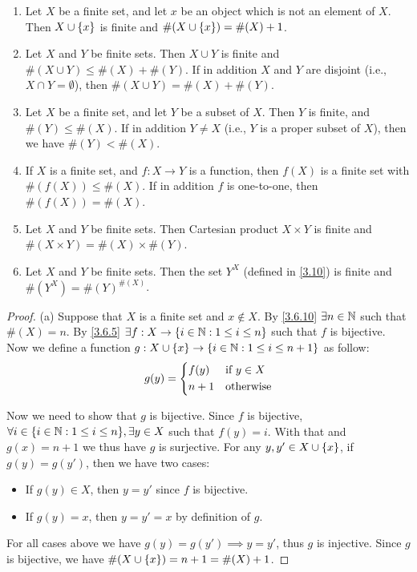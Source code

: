 \begin{prop}\label{3.6.14}
  \leavevmode
  \begin{enumerate}
    \item Let \(X\) be a finite set, and let \(x\) be an object which is not an element of \(X\).
          Then \(X \cup \left\lbrace x\right\rbrace\) is finite and \(\#(X \cup \left\lbrace x\right\rbrace) = \#(X) + 1\).
    \item Let \(X\) and \(Y\) be finite sets.
          Then \(X \cup Y\) is finite and \(\#(X \cup Y) \leq \#(X) + \#(Y)\).
          If in addition \(X\) and \(Y\) are disjoint (i.e., \(X \cap Y = \emptyset\)), then \(\#(X \cup Y) = \#(X) + \#(Y)\).
    \item Let \(X\) be a finite set, and let \(Y\) be a subset of \(X\).
          Then \(Y\) is finite, and \(\#(Y) \leq \#(X)\).
          If in addition \(Y \neq X\) (i.e., \(Y\) is a proper subset of \(X\)), then we have \(\#(Y) < \#(X)\).
    \item If \(X\) is a finite set, and \(f : X \to Y\) is a function, then \(f(X)\) is a finite set with \(\#(f(X)) \leq \#(X)\).
          If in addition \(f\) is one-to-one, then \(\#(f(X)) = \#(X)\).
    \item Let \(X\) and \(Y\) be finite sets.
          Then Cartesian product \(X \times Y\) is finite and \(\#(X \times Y) = \#(X) \times \#(Y)\).
    \item Let \(X\) and \(Y\) be finite sets.
          Then the set \(Y^X\) (defined in \cref{3.10}) is finite and \(\#(Y^X) = \#(Y)^{\#(X)}\).
  \end{enumerate}
\end{prop}

\begin{proof}{(a)}
  Suppose that \(X\) is a finite set and \(x \notin X\).
  By \cref{3.6.10} \(\exists n \in \mathbb{N}\) such that \(\#(X) = n\).
  By \cref{3.6.5} \(\exists f : X \to \left\lbrace i \in \mathbb{N} : 1 \leq i \leq n\right\rbrace\) such that \(f\) is bijective.
  Now we define a function \(g : X \cup \left\lbrace x\right\rbrace \to \left\lbrace i \in \mathbb{N} : 1 \leq i \leq n + 1\right\rbrace\) as follow:
  \[
    g(y) = \begin{dcases}
      f(y)  & \text{if } y \in X \\
      n + 1 & \text{otherwise}
    \end{dcases}
  \]

  Now we need to show that \(g\) is bijective.
  Since \(f\) is bijective, \(\forall i \in \set{i \in \N : 1 \leq i \leq n}, \exists y \in X\) such that \(f(y) = i\).
  With that and \(g(x) = n + 1\) we thus have \(g\) is surjective.
  For any \(y, y' \in X \cup \left\lbrace x\right\rbrace\), if \(g(y) = g(y')\), then we have two cases:
  \begin{itemize}
    \item If \(g(y) \in X\), then \(y = y'\) since \(f\) is bijective.
    \item If \(g(y) = x\), then \(y = y' = x\) by definition of \(g\).
  \end{itemize}
  For all cases above we have \(g(y) = g(y') \implies y = y'\), thus \(g\) is injective.
  Since \(g\) is bijective, we have \(\#(X \cup \left\lbrace x\right\rbrace) = n + 1 = \#(X) + 1\).
\end{proof}

